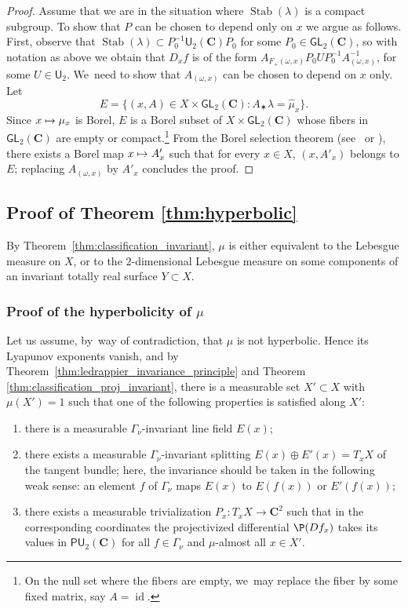 \documentclass[JEP,XML,SOM,Unicode,published]{cedram}
\newenvironment{enumeratea}
{\bgroup\def\theenumi{\alph{enumi}}\begin{enumerate}}
{\end{enumerate}\egroup}
\newcommand\mto{\mathchoice{\longmapsto}{\mapsto}{\mapsto}{\mapsto}}
\let\sep :
\newcommand{\bset}[1]{\bigl\{#1\bigr\}}
\newcommand{\inv}{^{-1}}
\DeclareMathOperator{\id}{id}
\DeclareMathOperator{\Stab}{Stab}
\def\C{\mathbf{C}}
\newcommand\GL{{\mathsf{GL}}}
\theoremstyle{plain}
\theoremstyle{definition}
\begin{document}
\begin{proof}
Assume that we are in the situation where $\Stab(\lambda)$ is a compact subgroup.
To show that $P$ can be chosen to depend only on $x$ we argue as follows. First, observe that
$\Stab(\lambda) \subset P_0\inv \mathsf{U}_2(\C)P_0 $ for some $P_0\in \GL_2(\C)$, so with notation as above we obtain that $D_xf$ is of the form
$A_{F_+(\omega, x)} P_0 U P_0\inv A_{(\omega, x)}\inv$, for some $U\in \mathsf{U}_2$. We~need to show that $A_{(\omega, x)}$ can be chosen to depend on $x$ only.
Let
\begin{equation*}
E = \bset{(x, A)\in X\times \GL_2(\C)\sep  A_\varstar \lambda = \hat \mu_x}.
\end{equation*} Since
$x\mto \mu_x$ is Borel, $E$ is a Borel subset
of $X\times \GL_2(\C)$ whose fibers in $\GL_2(\C)$ are empty or compact.\footnote{On the null set where the fibers are empty, we~may replace the fiber by some fixed matrix, say $A=\id$.}
From the Borel selection theorem (see~\cite[Th.\,6.9.6]{bogachev_book} or \hbox{\cite[App.\,A]{Zimmer:book}}), there exists a Borel map $x\mto A'_x$ such that for every $x\in X$, $(x, A'_x)$ belongs to $E$; replacing
$A_{(\omega, x)}$ by $A'_x$ concludes the proof.
\end{proof}

\subsection{Proof of Theorem \ref{thm:hyperbolic}}\label{subs:proof_hyperbolic}
By Theorem~\ref{thm:classification_invariant},
$\mu$ is either equivalent to the Lebesgue measure on $X$, or to the $2$-dimensional Lebesgue measure on some components of an invariant totally real surface $Y\subset X$.

\subsubsection{Proof of the hyperbolicity of $\mu$}\label{subsubsec:721}
Let us assume, by~way of contradiction, that $\mu$ is not hyperbolic. Hence its Lyapunov exponents vanish,
and by Theorem~\ref{thm:ledrappier_invariance_principle} and Theorem \ref{thm:classification_proj_invariant}, there
is a measurable set $X'\subset X$
with $\mu(X') = 1$ such that one of the following properties is satisfied along $X'$: \label{alternative_abc}
\begin{enumeratea}
\item\label{case:a} there is a measurable $\Gamma_\nu$-invariant line field $E(x)$;
\item\label{case:b} there exists a measurable $\Gamma_\nu$-invariant splitting $E(x)\oplus E'(x)=T_xX$ of the tangent bundle;
here, the invariance should be taken in the following weak sense: an element $f$ of $\Gamma_\nu$ maps $E(x)$ to
$E(f(x))$ or $E'(f(x))$;
\item\label{case:c} there exists a measurable trivialization $P_x\colon T_xX\to \C^2$ such that in the corresponding coordinates
the projectivized
differential $\P(Df_x)$ takes its values in $\mathsf {PU}_2(\C)$ for all $f\in \Gamma_\nu$ and $\mu$-almost all $x\in X'$.
\end{enumeratea}
\end{document}
